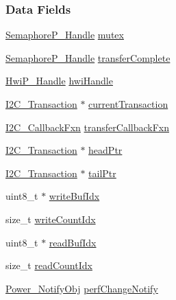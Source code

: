 \subsubsection*{Data Fields}
\begin{DoxyCompactItemize}
\item 
\hyperlink{_semaphore_p_8h_a7f34865f33e666455692544e5f12d1f2}{Semaphore\+P\+\_\+\+Handle} \hyperlink{struct_i2_c_m_s_p432___object_a5e99e2c1d15b5c1526f3db7b914bdcaa}{mutex}
\item 
\hyperlink{_semaphore_p_8h_a7f34865f33e666455692544e5f12d1f2}{Semaphore\+P\+\_\+\+Handle} \hyperlink{struct_i2_c_m_s_p432___object_aa0ae465ee677d9969407f5f53651ad2e}{transfer\+Complete}
\item 
\hyperlink{_hwi_p_8h_a7dd325ff62af296374efc6d317f5e368}{Hwi\+P\+\_\+\+Handle} \hyperlink{struct_i2_c_m_s_p432___object_a98cc37210ac060d1ce6a17025168982b}{hwi\+Handle}
\item 
\hyperlink{struct_i2_c___transaction}{I2\+C\+\_\+\+Transaction} $\ast$ \hyperlink{struct_i2_c_m_s_p432___object_aaf8fff5c7011d1e516a27470bbc654f8}{current\+Transaction}
\item 
\hyperlink{_i2_c_8h_aa7389002843eba77425c73b441358fd1}{I2\+C\+\_\+\+Callback\+Fxn} \hyperlink{struct_i2_c_m_s_p432___object_a12e9573d0788ce0f891c9af9b6172838}{transfer\+Callback\+Fxn}
\item 
\hyperlink{struct_i2_c___transaction}{I2\+C\+\_\+\+Transaction} $\ast$ \hyperlink{struct_i2_c_m_s_p432___object_a18d8fd278c50381e06d5c1bc9d1c1ac8}{head\+Ptr}
\item 
\hyperlink{struct_i2_c___transaction}{I2\+C\+\_\+\+Transaction} $\ast$ \hyperlink{struct_i2_c_m_s_p432___object_af4cdd60a7d3ab13fceb3df50fc5013dd}{tail\+Ptr}
\item 
uint8\+\_\+t $\ast$ \hyperlink{struct_i2_c_m_s_p432___object_a94676283ea5f659a9018024924929200}{write\+Buf\+Idx}
\item 
size\+\_\+t \hyperlink{struct_i2_c_m_s_p432___object_ad3a7558c91f2d397f1d518ad6c80d6f1}{write\+Count\+Idx}
\item 
uint8\+\_\+t $\ast$ \hyperlink{struct_i2_c_m_s_p432___object_a4f6d120d5e37258abc4dccd2e31fbc62}{read\+Buf\+Idx}
\item 
size\+\_\+t \hyperlink{struct_i2_c_m_s_p432___object_ae1c5510acb0d22cb7e5c878fa8ad49d3}{read\+Count\+Idx}
\item 
\hyperlink{struct_power___notify_obj}{Power\+\_\+\+Notify\+Obj} \hyperlink{struct_i2_c_m_s_p432___object_a4cb6e370da54e98d9a9531d9c85a094e}{perf\+Change\+Notify}

\end{DoxyCompactItemize}
